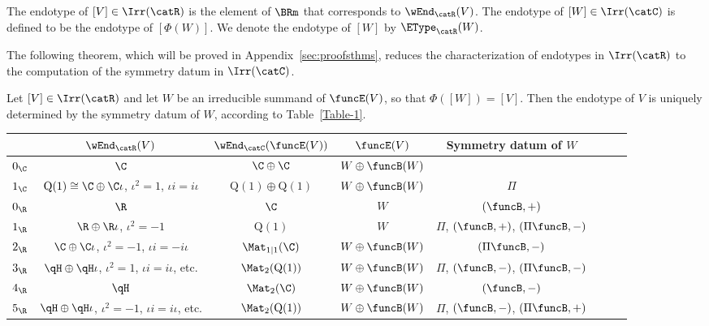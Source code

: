 \documentclass[12pt]{amsart}
\begin{document}
\begin{dfn}
The endotype of $[V]\in\Irr(\catR)$ is the element of $\BRm$  that corresponds to $\wEnd_{\catR}(V)$. The endotype of $[W]\in\Irr(\catC)$ is defined to be the endotype of $[\Phi(W)]$. We denote the endotype of $[W]$ by $\EType_\catR(W)$. 
\end{dfn} 

The following theorem, which will be proved in Appendix~\ref{sec:proofsthms}, reduces the characterization of endotypes in  $\Irr(\catR)$ to the computation of the symmetry datum 
in $\Irr(\catC)$. 
\begin{thm}
\label{thm:Table}
Let $[V]\in\Irr(\catR)$ and 
let $W$  be an irreducible summand of $\funcE(V)$, so that  $\Phi([W])=[V]$. Then
the endotype of $V$  is uniquely determined by the symmetry datum of $W$, according to Table~\ref{Table-1}. 
\begin{table}[ht]
\begin{tabular}{|c|c|c|c|c|c|c|c|}
\hline
& $\wEnd_\catR(V)$ & $\wEnd_\catC(\funcE(V))$ & 
$\funcE(V)$ & 
Symmetry datum of $W$
\\
\hline
$0_\C$ 
& $\C$ 
& $\C\oplus\C$ 
& 
$W\oplus \funcB(W)$
&  
\\
\hline
$1_\C$ 
&   
$\mathrm Q(1)\cong \C\oplus \C \iota$, $\iota^2=1$, $\iota i=i\iota$
&
$\mathrm Q(1)\oplus \mathrm Q(1)$
&
$W\oplus \funcB(W)$
&
$\Pi$
\\

\hline
$0_\R$
&
$\R$ 
&
$\C$ 
&
$W$

& 

$(\funcB,+)$
\\
\hline 
$1_\R$ &
$\R\oplus \R\iota$, $\iota^2=-1$
&
$\mathrm Q(1)$
&
$W$
&
$\Pi$, $(\funcB,+)$,  
$(\Pi\funcB,-)$\\
\hline
$2_\R$ &
$\C\oplus \C\iota$, $\iota^2=-1$, $\iota i=-i\iota$ & 
$\Mat_{1|1}(\C)$ & $W\oplus \funcB(W)$
& 
{
$(\Pi\funcB,-)$
}

\\
\hline
$3_\R$ & $\qH\oplus \qH\iota$, $\iota^2=1$, $\iota i=i\iota$, etc.
& $\Mat_{2}(\mathrm Q(1))$ & 
$W\oplus \funcB(W)$ & 
{
$\Pi$, $(\funcB,-)$, 
$(\Pi\funcB,-)$}\\
\hline
$4_\R$ & $\qH$ & $\Mat_{2}(\C)$ & 
$W\oplus \funcB(W)$ & 
{
$(\funcB,-)$
} 
\\
\hline $5_\R$ & $\qH\oplus \qH\iota$, $\iota^2=-1$, $\iota i=i\iota$, etc.
& 
$\Mat_{2}(\mathrm Q(1))$ & $W\oplus \funcB(W)$ & 
{
$\Pi$, $(\funcB,-)$, $(\Pi\funcB,+)$}
\\


\end{tabular}
\end{table}
\end{thm}
\end{document}
